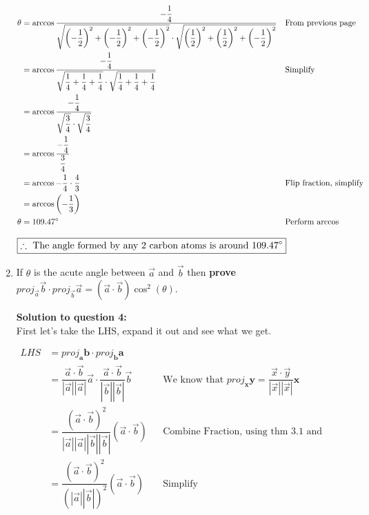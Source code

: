 \documentclass[12pt]{book}
\newcommand{\vectorproj}[2][]{\textit{proj}_{\vect{#1}}\vect{#2}}
\newcommand{\vect}{\mathbf}
\begin{document}
\begin{enumerate}
\newpage

\addtolength{\jot}{1em}
\begin{align*}
  \theta &= \arccos \dfrac{-\dfrac{1}{4}}{\sqrt{\left(-\dfrac{1}{2} \right)^2 + \left(-\dfrac{1}{2} \right)^2 + \left(-\dfrac{1}{2} \right)^2} \cdot \sqrt{\left(\dfrac{1}{2} \right)^2 + \left(\dfrac{1}{2} \right)^2 + \left(-\dfrac{1}{2} \right)^2}} && \text{From previous page} \\
  &= \arccos \dfrac{-\dfrac{1}{4}}{\sqrt{\dfrac{1}{4} + \dfrac{1}{4} + \dfrac{1}{4}} \cdot \sqrt{\dfrac{1}{4} + \dfrac{1}{4} + \dfrac{1}{4}}} && \text{Simplify} \\
  &= \arccos \dfrac{-\dfrac{1}{4}}{\sqrt{\dfrac{3}{4}} \cdot \sqrt{\dfrac{3}{4}}} \\
  &= \arccos \dfrac{-\dfrac{1}{4}}{\dfrac{3}{4}} \\
  &= \arccos -\dfrac{1}{4}\cdot\dfrac{4}{3} && \text{Flip fraction, simplify} \\
  &= \arccos \left( -\dfrac{1}{3} \right) \\
  \theta &= 109.47 \degree && \text{Perform arccos}\\
\end{align*}

\begin{center}
  $\boxed{\therefore \text{ The angle formed by any 2 carbon atoms is around } 109.47 \degree }$
\end{center}

\newpage

\item If $\theta$ is the acute angle between $\vec{a}$ and $\vec{b}$ then \textbf{prove} $proj_{\vec{a}}\vec{b} \cdot proj_{\vec{b}}\vec{a} = (\vec{a} \cdot \vec{b}) \cos^2(\theta)$.

\vspace{0.3cm} 
\textbf{Solution to question 4:}\\
 First let's take the LHS, expand it out and see what we get.
\vspace{0.3cm}

\addtolength{\jot}{1em}
\begin{align*}
  LHS &= \vectorproj[a]{b} \cdot \vectorproj[b]{a} \\
   &= \dfrac{\vec{a} \cdot \vec{b}}{|\vec{a}||\vec{a}|}\vec{a} \cdot \dfrac{\vec{a} \cdot \vec{b}}{|\vec{b}||\vec{b}|}\vec{b} && \text{We know that } \vectorproj[x]{y} = \dfrac{\vec{x} \cdot \vec{y}}{|\vec{x}||\vec{x}|}\vect{x}\\
   &= \dfrac{(\vec{a} \cdot \vec{b})^2}{|\vec{a}||\vec{a}||\vec{b}||\vec{b}|}(\vec{a} \cdot \vec{b}) && \text{Combine Fraction, using thm 3.1 and algebraic manipuulation}\\
   &= \dfrac{(\vec{a} \cdot \vec{b})^2}{(|\vec{a}||\vec{b}|)^2}(\vec{a} \cdot \vec{b}) && \text{Simplify} \\
\end{align*}


\end{enumerate}
\end{document}
